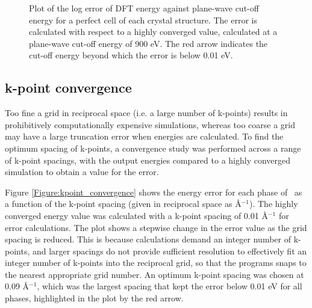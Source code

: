 \begin{figure}[ht] %
	\begin{center}
		\caption{Plot of the log error of DFT energy against plane-wave cut-off energy for a perfect cell of each crystal structure. The error is calculated with respect to a highly converged value, calculated at a plane-wave cut-off energy of 900 eV. The red arrow indicates the cut-off energy beyond which the error is below 0.01 eV.}
		\label{Figure:cutoffconvergence}
	\end{center}
\end{figure}

\subsection{k-point convergence}

Too fine a grid in reciprocal space (i.e. a large number of k-points) results in prohibitively computationally expensive simulations, whereas too coarse a grid may have a large truncation error when energies are calculated. To find the optimum spacing of k-points, a convergence study was performed across a range of k-point spacings, with the output energies compared to a highly converged simulation to obtain a value for the error. 

Figure \ref{Figure:kpoint_convergence} shows the energy error for each phase of \zirconia\ as a function of the k-point spacing (given in reciprocal space as \r{A}$^{-1}$). The highly converged energy value was calculated with a k-point spacing of 0.01 \r{A}$^{-1}$ for error calculations. The plot shows a stepwise change in the error value as the grid spacing is reduced. This is because calculations demand an integer number of k-points, and larger spacings do not provide sufficient resolution to effectively fit an integer number of k-points into the reciprocal grid, so that the programs snaps to the nearest appropriate grid number. An optimum k-point spacing was chosen at 0.09 \r{A}$^{-1}$, which was the largest spacing that kept the error below 0.01 eV for all phases, highlighted in the plot by the red arrow.


